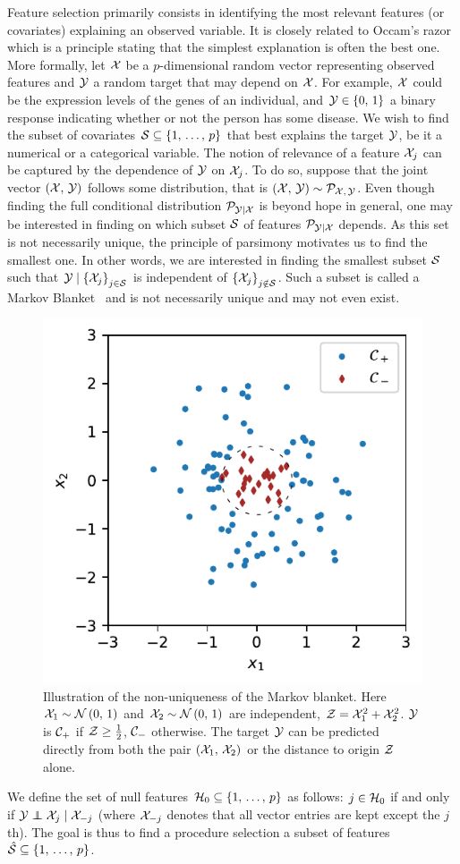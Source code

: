 Feature selection primarily consists in identifying the most relevant features (or covariates)
explaining an observed variable.
It is closely related to Occam's razor which is a principle stating that
the simplest explanation is often the best one.
More formally, let $\mathcal{X}$ be a $p$-dimensional random vector representing observed features
and $\mathcal{Y}$ a random target that may depend on $\mathcal{X}$.
For example, $\mathcal{X}$ could be the expression levels of the genes of an individual,
and $\mathcal{Y} \in \left\{ 0,\, 1 \right\}$ a binary response indicating whether or not the person has some disease.
We wish to find the subset of covariates $\mathcal{S} \subseteq \left\{ 1,\, \dots,\, p \right\}$ that best explains the target $\mathcal{Y}$,
be it a numerical or a categorical variable.
The notion of relevance of a feature $\mathcal{X}_j$ can be captured by the dependence of $\mathcal{Y}$ on $\mathcal{X}_j$.
To do so, suppose that the joint vector $\left( \mathcal{X},\, \mathcal{Y} \right)$ follows some distribution,
that is $\left( \mathcal{X},\, \mathcal{Y} \right) \sim \mathcal{P}_{\mathcal{X},\, \mathcal{Y}}$.
Even though finding the full conditional distribution $\mathcal{P}_{\mathcal{Y} \mid \mathcal{X}}$ is beyond hope in general,
one may be interested in finding on which subset $\mathcal{S}$ of features $\mathcal{P}_{\mathcal{Y} \mid \mathcal{X}}$ depends.
As this set is not necessarily unique,
the principle of parsimony motivates us to find the smallest one.
In other words, we are interested in finding the smallest subset $\mathcal{S}$ such that
$\mathcal{Y} \mid \left\{ \mathcal{X}_j \right\}_{j \in \mathcal{S}}$ is independent of $\left\{ \mathcal{X}_j \right\}_{j \notin \mathcal{S}}$.
Such a subset is called a Markov Blanket~\citep{markov_blanket, markov_blanket_fs}
and is not necessarily unique and may not even exist.
\begin{figure}[h]
    \centering
    \includegraphics[width=0.4\linewidth]{figures/fs_subset_not_unique.pdf}
    \caption{
        Illustration of the non-uniqueness of the Markov blanket.
        Here $\mathcal{X}_1 \sim \mathcal{N}\left( 0,\, 1 \right)$
        and $\mathcal{X}_2 \sim \mathcal{N}\left( 0,\, 1 \right)$ are independent,
        $\mathcal{Z} = \mathcal{X}_1^2 + \mathcal{X}_2^2$.
        $\mathcal{Y}$ is $\mathcal{C}_+$ if $\mathcal{Z} \geq \frac{1}{2}$,
        $\mathcal{C}_-$ otherwise.
        The target $\mathcal{Y}$ can be predicted directly from both the pair $\left( \mathcal{X}_1,\, \mathcal{X}_2 \right)$
        or the distance to origin $\mathcal{Z}$ alone.
    }
    \label{fig:fs_subset_not_unique}
\end{figure}
We define the set of null features $\mathcal{H}_0 \subseteq \left\{ 1,\, \dots,\, p \right\}$ as follows:
$j \in \mathcal{H}_0$ if and only if $\cY \independent \cX_j \mid \cX_{-j}$
(where $\mathcal{X}_{-j}$ denotes that all vector entries are kept except the $j$th).
The goal is thus to find a procedure selection a subset of features
$\hat{\mathcal{S}} \subseteq \left\{ 1,\, \dots,\, p \right\}$.

